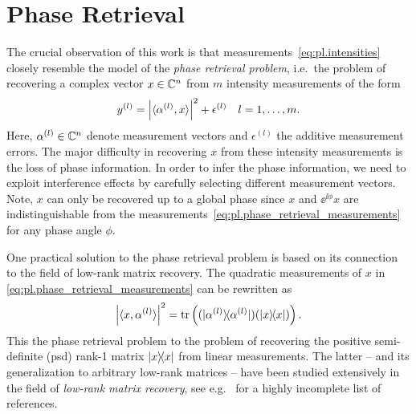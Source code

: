 \section{Phase Retrieval}%
\label{sec:pl.phase_retrieval}

The crucial observation of this work is that measurements~\eqref{eq:pl.intensities} closely resemble the model of the \textit{phase retrieval problem}, i.e.\ the problem of recovering a complex vector ${x} \in {\mathbb{C}}^n$ from $m$ intensity measurements of the form
\[
  y^{(l)}= {\left\vert\braket{\alpha^{(l)}, x}\right\vert}^2 + \epsilon^{(l)}
  \quad l=1,\ldots,m.
  \label{eq:pl.phase_retrieval_measurements}
\]
Here, $\alpha^{(l)} \in {\mathbb{C}}^n$ denote measurement vectors and $\epsilon^{(l)}$ the additive measurement errors.
The major difficulty in recovering $x$ from these intensity measurements is the loss of phase information.
In order to infer the phase information, we need to exploit interference effects by carefully selecting different measurement vectors.
Note, $x$ can only be recovered up to a global phase since $x$ and $\ee^{\ii\phi} x$ are indistinguishable from the measurements~\eqref{eq:pl.phase_retrieval_measurements} for any phase angle $\phi$.

One practical solution to the phase retrieval problem is based on its connection to the field of low-rank matrix recovery.
The quadratic measurements of $x$ in \cref{eq:pl.phase_retrieval_measurements} can be rewritten as
\[
  \left| \langle {x}, \alpha^{(l)} \rangle \right|^2
  = \tr \left( (\ket{\alpha^{(l)}}\bra{\alpha^{(l)}}) (\ket{{x}}\bra{{x}}) \right).
\]
This  the phase retrieval problem to the problem of recovering the positive semi-definite (psd) rank-1 matrix $\ketbra{x}$ from linear measurements.
The latter -- and its generalization to arbitrary low-rank matrices -- have been studied extensively in the field of \emph{low-rank matrix recovery}, see e.g.~\cite{Ahmed_2014_Blind,Candes_2009_Exact,Candes_2011_Tight,Recht_2010_Guaranteed,Gross_2011_Recovering,Chen_2015_IncoherenceOptimal} for a highly incomplete list of references.

